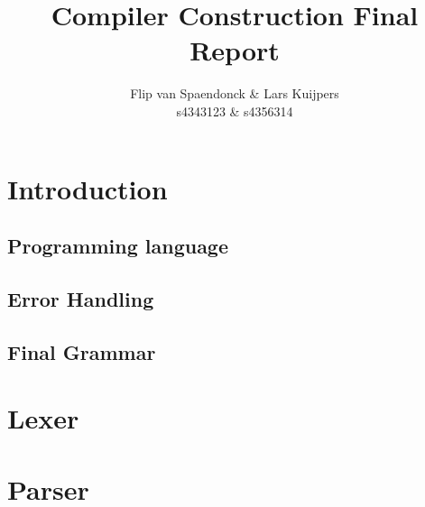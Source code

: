 \documentclass[10pt,a4paper]{article}
\author{Flip van Spaendonck \& Lars Kuijpers \\ s4343123 \& s4356314}
\title{Compiler Construction Final Report}
\begin{document}
\maketitle
\tableofcontents

\section{Introduction}
\subsection{Programming language}
\subsection{Error Handling}
\subsection{Final Grammar}


\section{Lexer}


\section{Parser}
\end{document}
